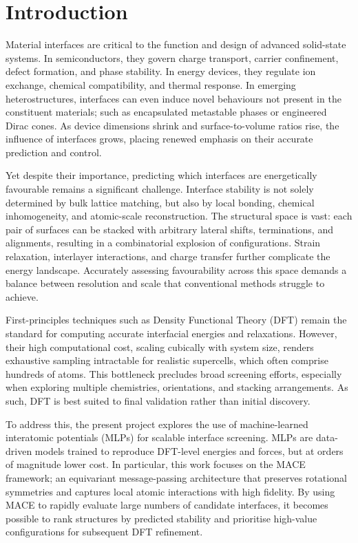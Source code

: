 \chapter{Introduction}
\label{chapter:introduction}

Material interfaces are critical to the function and design of advanced solid-state systems. In semiconductors, they
govern charge transport, carrier confinement, defect formation, and phase stability. In energy devices, they regulate
ion exchange, chemical compatibility, and thermal response. In emerging heterostructures, interfaces can even induce
novel behaviours not present in the constituent materials; such as encapsulated metastable phases or engineered Dirac
cones. As device dimensions shrink and surface-to-volume ratios rise, the influence of interfaces grows, placing
renewed emphasis on their accurate prediction and control.

Yet despite their importance, predicting which interfaces are energetically favourable remains a significant challenge.
Interface stability is not solely determined by bulk lattice matching, but also by local bonding, chemical
inhomogeneity, and atomic-scale reconstruction. The structural space is vast: each pair of surfaces can be stacked with
arbitrary lateral shifts, terminations, and alignments, resulting in a combinatorial explosion of configurations.
Strain relaxation, interlayer interactions, and charge transfer further complicate the energy landscape. Accurately
assessing favourability across this space demands a balance between resolution and scale that conventional methods
struggle to achieve.

First-principles techniques such as Density Functional Theory (DFT) remain the standard for computing accurate
interfacial energies and relaxations. However, their high computational cost, scaling cubically with system size,
renders exhaustive sampling intractable for realistic supercells, which often comprise hundreds of atoms. This
bottleneck precludes broad screening efforts, especially when exploring multiple chemistries, orientations, and
stacking arrangements. As such, DFT is best suited to final validation rather than initial discovery.

To address this, the present project explores the use of machine-learned interatomic potentials (MLPs) for scalable
interface screening. MLPs are data-driven models trained to reproduce DFT-level energies and forces, but at orders of
magnitude lower cost. In particular, this work focuses on the MACE framework; an equivariant message-passing
architecture that preserves rotational symmetries and captures local atomic interactions with high fidelity. By using
MACE to rapidly evaluate large numbers of candidate interfaces, it becomes possible to rank structures by predicted
stability and prioritise high-value configurations for subsequent DFT refinement.

